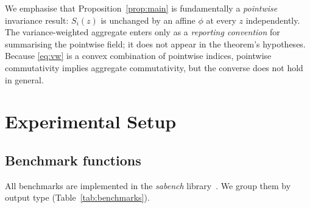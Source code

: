 \documentclass[11pt,onecolumn]{article}
\begin{document}
We emphasise that Proposition~\ref{prop:main} is fundamentally a
\emph{pointwise} invariance result: $S_i(z)$ is unchanged by an affine $\phi$
at every $z$ independently.  The variance-weighted aggregate enters only as a
\emph{reporting convention} for summarising the pointwise field; it does not
appear in the theorem's hypotheses. Because \eqref{eq:vw} is a convex
combination of pointwise indices, pointwise commutativity implies aggregate
commutativity, but the converse does not hold in general.

\section{Experimental Setup}
\label{sec:setup}

\subsection{Benchmark functions}
\label{sec:benchmarks}

All benchmarks are implemented in the \textit{sabench} library~\citep{Hettinger2025}.
We group them by output type (Table~\ref{tab:benchmarks}).
\end{document}
